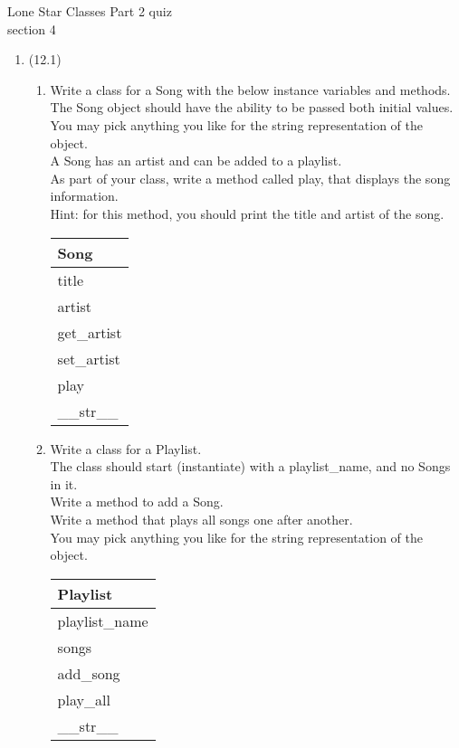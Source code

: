\documentclass{article}
\begin{document}

Lone Star \hfill Classes Part 2 quiz\\
section 4\\
\begin{enumerate}
\item (12.1)
	\begin{enumerate}
		\item
			Write a class for a Song with the below instance variables and methods.\\ 
			The Song object should have the ability to be passed both initial values.\\  
			You may pick anything you like for the string representation of the object.\\
			A Song has an artist and can be added to a playlist.\\  
			As part of your class, write a method called play, that displays the song information.\\
			Hint: for this method, you should print the title and artist of the song.
			\begin{flushright}
			\begin{tabular}{|l|}
				\hline
				Song\\ \hline
				title \\	artist\\	 \hline
				get\_artist \\ set\_artist \\ play \\ \_\_str\_\_ \\ \hline
			\end{tabular}
			\end{flushright}

		\item
			Write a class for a Playlist. \\
			The class should start (instantiate) with a playlist\_name, and no Songs in it. \\ 
			Write a method to add a Song.\\
			Write a method that plays all songs one after another.\\
			You may pick anything you like for the string representation of the object.
	
			\begin{flushright}
			\begin{tabular}{|l|}
				\hline
				Playlist\\ \hline  	%
				playlist\_name \\ songs\\ \hline		%
				add\_song \\ play\_all \\ \_\_str\_\_ \\ \hline		%
			\end{tabular}
			\end{flushright}


\end{enumerate}
\end{enumerate}
\end{document}
